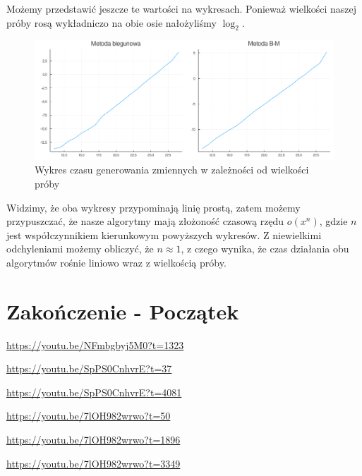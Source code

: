 \documentclass[12pt]{mwrep}
\begin{document}
	\noindent Możemy przedstawić jeszcze te wartości na wykresach. Ponieważ wielkości naszej próby rosą wykładniczo na obie osie nałożyliśmy $\log_2$. 
	\begin{figure}[H]\caption{Wykres czasu generowania zmiennych w zależności od wielkości próby}\label{fig:normal_time}
		\includegraphics[width=\columnwidth]{fig/fig_normal_time.png}
	\end{figure}
	\noindent Widzimy, że oba wykresy przypominają linię prostą, zatem możemy przypuszczać, że nasze algorytmy mają złożoność czasową rzędu $o(x^n)$, gdzie $n$ jest współczynnikiem kierunkowym powyższych wykresów. Z niewielkimi odchyleniami możemy obliczyć, że $n\approx 1$, z czego wynika, że czas działania obu algorytmów rośnie liniowo wraz z wielkością próby.

	
	\section{Zakończenie - Początek}
	
	
	\begin{thebibliography}{1}
		\url{https://youtu.be/NFmbgbyj5M0?t=1323}
		
		\url{https://youtu.be/SpPS0CnhvrE?t=37}
		
		\url{https://youtu.be/SpPS0CnhvrE?t=4081}
		
		\url{https://youtu.be/7lOH982wrwo?t=50}
		
		\url{https://youtu.be/7lOH982wrwo?t=1896}
		
		\url{https://youtu.be/7lOH982wrwo?t=3349}

	\end{thebibliography}
	
\end{document}
